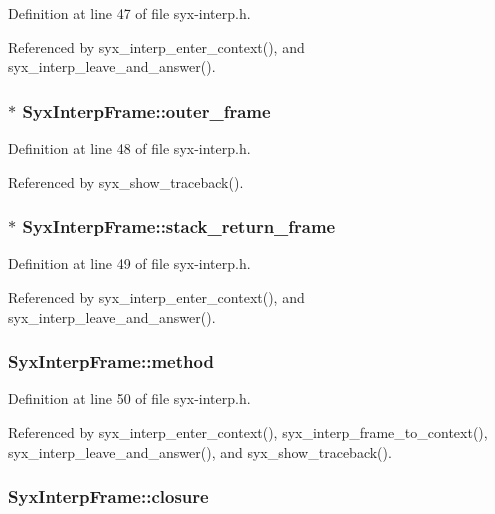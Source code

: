 Definition at line 47 of file syx-interp.h.

Referenced by syx\_\-interp\_\-enter\_\-context(), and syx\_\-interp\_\-leave\_\-and\_\-answer().\hypertarget{struct_syx_interp_frame_335377c41e8c70178ad2a5ddf66508b4}{
\subsubsection{$\ast$ {\bf SyxInterpFrame::outer\_\-frame}}}
\label{struct_syx_interp_frame_335377c41e8c70178ad2a5ddf66508b4}




Definition at line 48 of file syx-interp.h.

Referenced by syx\_\-show\_\-traceback().\hypertarget{struct_syx_interp_frame_da8f1ef4a738fbc3289aad49cf419a6e}{
\subsubsection{$\ast$ {\bf SyxInterpFrame::stack\_\-return\_\-frame}}}
\label{struct_syx_interp_frame_da8f1ef4a738fbc3289aad49cf419a6e}




Definition at line 49 of file syx-interp.h.

Referenced by syx\_\-interp\_\-enter\_\-context(), and syx\_\-interp\_\-leave\_\-and\_\-answer().\hypertarget{struct_syx_interp_frame_85720d5804b47e6f194e492075cad886}{
\subsubsection{ {\bf SyxInterpFrame::method}}}
\label{struct_syx_interp_frame_85720d5804b47e6f194e492075cad886}




Definition at line 50 of file syx-interp.h.

Referenced by syx\_\-interp\_\-enter\_\-context(), syx\_\-interp\_\-frame\_\-to\_\-context(), syx\_\-interp\_\-leave\_\-and\_\-answer(), and syx\_\-show\_\-traceback().\hypertarget{struct_syx_interp_frame_8b361a6a8c7a7756bd7bf49adb6ebffd}{
\subsubsection{ {\bf SyxInterpFrame::closure}}}
\label{struct_syx_interp_frame_8b361a6a8c7a7756bd7bf49adb6ebffd}




